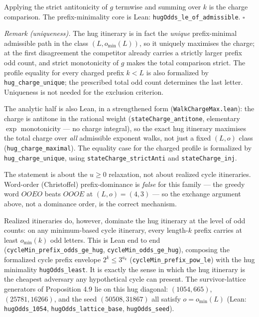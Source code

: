 \documentclass[12pt]{article}
\begin{document}
Applying the strict antitonicity of \(g\) termwise and summing over
\(k\) is the charge comparison. The prefix-minimality core is Lean:
\texttt{\nolinkurl{hugOdds_le_of_admissible}}. \(\square\)

\emph{Remark (uniqueness).} The hug itinerary is in fact the
\emph{unique} prefix-minimal admissible path in the class
\((L,o_{\min}(L))\), so it uniquely maximises the charge; at the first
disagreement the competitor already carries a strictly larger prefix odd
count, and strict monotonicity of \(g\) makes the total comparison
strict. The profile equality for every charged prefix \(k<L\) is also
formalized by \texttt{\nolinkurl{hug_charge_unique}}; the prescribed
total odd count determines the last letter. Uniqueness is not needed for
the exclusion criterion.

The analytic half is also Lean, in a strengthened form
(\texttt{\nolinkurl{WalkChargeMax.lean}}): the charge is antitone in the
rational weight (\texttt{\nolinkurl{stateCharge_antitone}}, elementary
\(\exp\) monotonicity --- no charge integral), so the exact hug
itinerary maximises the total charge over \emph{all} admissible exponent
walks, not just a fixed \((L,o)\) class
(\texttt{\nolinkurl{hug_charge_maximal}}). The equality case for the
charged profile is formalized by \texttt{\nolinkurl{hug_charge_unique}},
using \texttt{\nolinkurl{stateCharge_strictAnti}} and
\texttt{\nolinkurl{stateCharge_inj}}.

The statement is about the \(u\ge 0\) relaxation, not about realized
cycle itineraries. Word-order (Christoffel) prefix-dominance is
\emph{false} for this family --- the greedy word \(OOEO\) beats \(OOOE\)
at \((L,o)=(4,3)\) --- so the exchange argument above, not a dominance
order, is the correct mechanism.

Realized itineraries do, however, dominate the hug itinerary at the
level of odd counts: on any minimum-based cycle itinerary, every
length-\(k\) prefix carries at least \(o_{\min}(k)\) odd letters. This
is Lean end to end (\texttt{\nolinkurl{cycleMin_prefix_odds_ge_hug}},
\texttt{\nolinkurl{cycleMin_odds_ge_hug}}), composing the formalized
cycle prefix envelope \(2^k\le 3^{a_k}\)
(\texttt{\nolinkurl{cycleMin_prefix_pow_le}}) with the hug minimality
\texttt{\nolinkurl{hugOdds_least}}. It is exactly the sense in which the
hug itinerary is the cheapest adversary any hypothetical cycle can
present. The survivor-lattice generators of Proposition 4.9 lie on this
hug diagonal: \((1054,665)\), \((25781,16266)\), and the seed
\((50508,31867)\) all satisfy \(o=o_{\min}(L)\) (Lean:
\texttt{\nolinkurl{hugOdds_1054}},
\texttt{\nolinkurl{hugOdds_lattice_base}},
\texttt{\nolinkurl{hugOdds_seed}}).
\end{document}
